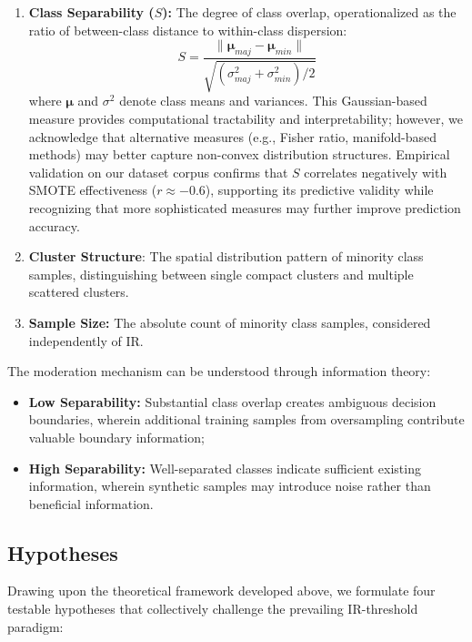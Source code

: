 \documentclass[12pt,a4paper]{article}
\theoremstyle{definition}
\begin{document}
\begin{enumerate}
 \item \textbf{Class Separability ($S$):} The degree of class overlap, operationalized as the ratio of between-class distance to within-class dispersion:
 \begin{equation}
 S = \frac{\|\boldsymbol{\mu}_{maj} - \boldsymbol{\mu}_{min}\|}{\sqrt{(\sigma^2_{maj} + \sigma^2_{min})/2}}
 \label{eq:separability}
 \end{equation}
 where $\boldsymbol{\mu}$ and $\sigma^2$ denote class means and variances. This Gaussian-based measure provides computational tractability and interpretability; however, we acknowledge that alternative measures (e.g., Fisher ratio, manifold-based methods) may better capture non-convex distribution structures. Empirical validation on our dataset corpus confirms that $S$ correlates negatively with SMOTE effectiveness ($r \approx -0.6$), supporting its predictive validity while recognizing that more sophisticated measures may further improve prediction accuracy.
 
 \item \textbf{Cluster Structure}: The spatial distribution pattern of minority class samples, distinguishing between single compact clusters and multiple scattered clusters.
 
 \item \textbf{Sample Size:} The absolute count of minority class samples, considered independently of IR.
\end{enumerate}

The moderation mechanism can be understood through information theory:
\begin{itemize}
 \item \textbf{Low Separability:} Substantial class overlap creates ambiguous decision boundaries, wherein additional training samples from oversampling contribute valuable boundary information;
 \item \textbf{High Separability:} Well-separated classes indicate sufficient existing information, wherein synthetic samples may introduce noise rather than beneficial information.
\end{itemize}

\subsection{Hypotheses}

Drawing upon the theoretical framework developed above, we formulate four testable hypotheses that collectively challenge the prevailing IR-threshold paradigm:
\end{document}

